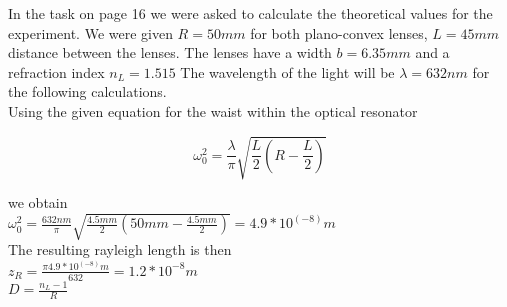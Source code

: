\documentclass{article}
\begin{document}
 In the task on page 16 we were asked to calculate the theoretical values for the experiment. We were given $R=50mm$ for both plano-convex lenses, $L=45mm$ distance between the lenses. The lenses have a width $b=6.35mm$ and a refraction index $n_{L} = 1.515$ The wavelength of the light will be $\lambda = 632nm$ for the following calculations.\\

 Using the given equation for the waist within the optical resonator

\begin{equation}
\omega_{0}^2 = \frac{\lambda}{\pi}\sqrt{\frac{L}{2}(R-\frac{L}{2})}
\label{omegawithinres}
\end{equation}

we obtain\\

$\omega_{0}^2 = \frac{632nm}{\pi}\sqrt{\frac{4.5mm}{2}(50mm-\frac{4.5mm}{2})} = 4.9*10^(-8) m$\\

The resulting rayleigh length is then\\

$z_{R} = \frac{\pi4.9*10^(-8) m}{632} = 1.2*10^{-8} m$\\

$D = \frac{n_{L}-1}{R}$
\end{document}
